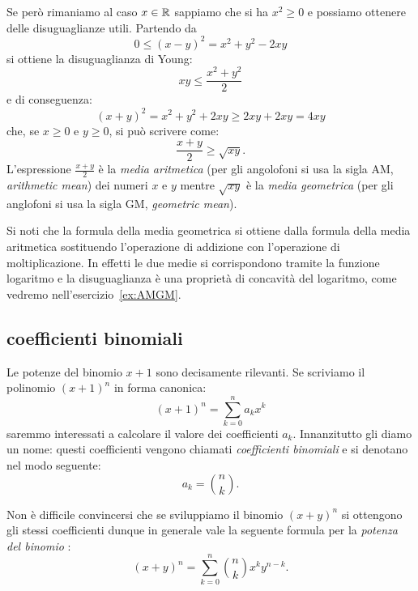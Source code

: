 Se però rimaniamo al caso $x\in {\mathbb R}$ sappiamo che si ha $x^2\ge 0$
e possiamo ottenere delle disuguaglianze utili.
Partendo da
\[
0 \le (x-y)^2 = x^2 + y^2 - 2xy
\]
si ottiene la disuguaglianza di Young:
%
%
\[
xy \le \frac{x^2+y^2}{2}
\]
e di conseguenza:
\[
 (x+y)^2 = x^2 + y^2 + 2xy \ge 2xy + 2xy = 4 xy
\]
che, se $x\ge 0$ e $y\ge 0$, si può scrivere come:
%
%
%
%
%
%
\[
   \frac{x+y}{2} \ge \sqrt{xy}.
\]
L'espressione $\frac{x+y}{2}$ è la \emph{media aritmetica}
(per gli angolofoni si usa la sigla AM, \emph{arithmetic mean})
dei numeri $x$ e $y$
mentre $\sqrt{xy}$ è la \emph{media geometrica}
(per gli anglofoni si usa la sigla GM, \emph{geometric mean}).

Si noti che la formula della media geometrica si ottiene dalla formula 
della media aritmetica sostituendo l'operazione di addizione con 
l'operazione di moltiplicazione.
In effetti le due medie si corrispondono tramite la funzione logaritmo
e la disuguaglianza è una proprietà di concavità del logaritmo,  
come vedremo nell'esercizio~\ref{ex:AMGM}.

\subsection{coefficienti binomiali}
\label{ch:binomiale}

Le potenze del binomio $x+1$ sono decisamente rilevanti. 
Se scriviamo il polinomio $(x+1)^n$ in forma canonica:
\[
  (x+1)^n = \sum_{k=0}^n a_k x^k  
\]
saremmo interessati a calcolare il valore
dei coefficienti $a_k$. 
Innanzitutto gli diamo un nome: questi coefficienti vengono chiamati 
\emph{coefficienti binomiali}%
%
%
e si denotano nel modo seguente:%
%
\[
    a_k = {n \choose k}.
\]

Non è difficile convincersi che se sviluppiamo il binomio $(x+y)^n$
si ottengono gli stessi coefficienti dunque
in generale vale la seguente formula per la \emph{potenza del binomio}%
%
:
% 
\begin{equation*}
  (x+y)^n = \sum_{k=0}^n {n \choose k} x^k y^{n-k}. 
\end{equation*}

